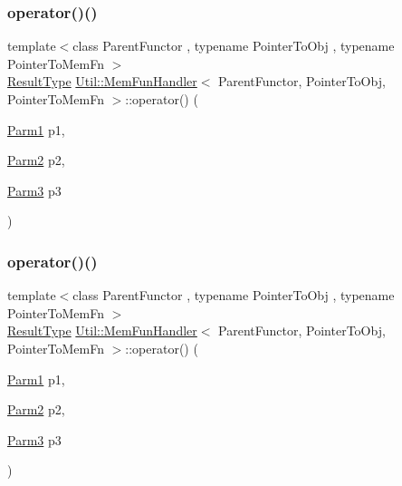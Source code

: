 \subsubsection{\texorpdfstring{operator()()}{operator()()}\hspace{0.1cm}{\footnotesize\ttfamily [7/12]}}
{\footnotesize\ttfamily template$<$class Parent\+Functor , typename Pointer\+To\+Obj , typename Pointer\+To\+Mem\+Fn $>$ \\
\mbox{\hyperlink{classUtil_1_1MemFunHandler_a093690dcced95ad48c5429e50006c83e}{Result\+Type}} \mbox{\hyperlink{classUtil_1_1MemFunHandler}{Util\+::\+Mem\+Fun\+Handler}}$<$ Parent\+Functor, Pointer\+To\+Obj, Pointer\+To\+Mem\+Fn $>$\+::operator() (\begin{DoxyParamCaption}\item[{\mbox{\hyperlink{classUtil_1_1MemFunHandler_a43182733677fc623d89e5613ecf15761}{Parm1}}}]{p1,  }\item[{\mbox{\hyperlink{classUtil_1_1MemFunHandler_a9d454c62047cb4bff3173b5bda9a38c8}{Parm2}}}]{p2,  }\item[{\mbox{\hyperlink{classUtil_1_1MemFunHandler_a6cbef94d16f4d6b29d6a8a90afbeff4f}{Parm3}}}]{p3 }\end{DoxyParamCaption})\hspace{0.3cm}{\ttfamily [inline]}}

\mbox{\label{classUtil_1_1MemFunHandler_ae5a7b0421e77aa263c762df15c043ea4}} 
\subsubsection{\texorpdfstring{operator()()}{operator()()}\hspace{0.1cm}{\footnotesize\ttfamily [8/12]}}
{\footnotesize\ttfamily template$<$class Parent\+Functor , typename Pointer\+To\+Obj , typename Pointer\+To\+Mem\+Fn $>$ \\
\mbox{\hyperlink{classUtil_1_1MemFunHandler_a093690dcced95ad48c5429e50006c83e}{Result\+Type}} \mbox{\hyperlink{classUtil_1_1MemFunHandler}{Util\+::\+Mem\+Fun\+Handler}}$<$ Parent\+Functor, Pointer\+To\+Obj, Pointer\+To\+Mem\+Fn $>$\+::operator() (\begin{DoxyParamCaption}\item[{\mbox{\hyperlink{classUtil_1_1MemFunHandler_a43182733677fc623d89e5613ecf15761}{Parm1}}}]{p1,  }\item[{\mbox{\hyperlink{classUtil_1_1MemFunHandler_a9d454c62047cb4bff3173b5bda9a38c8}{Parm2}}}]{p2,  }\item[{\mbox{\hyperlink{classUtil_1_1MemFunHandler_a6cbef94d16f4d6b29d6a8a90afbeff4f}{Parm3}}}]{p3 }\end{DoxyParamCaption})\hspace{0.3cm}{\ttfamily [inline]}}

